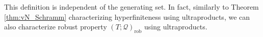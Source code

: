 \documentclass[11pt]{amsart}
\DeclareMathOperator{\tr}{tr}
\newcommand{\C}{{\mathbb{C}}}
\theoremstyle{definition}
\newtheorem{definition}[theorem]{Definition}
\theoremstyle{remark}
\theoremstyle{definition}
\begin{document}


This definition is independent of the generating set. In fact, similarly to Theorem \ref{thm:vN_Schramm} characterizing hyperfiniteness using ultraproducts, we can also characterize robust property $(T;\mathcal Q)_{\mathrm{rob}}$ using ultraproducts. 
\end{document}
